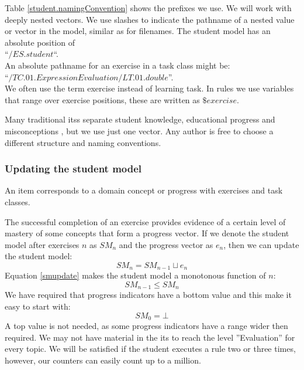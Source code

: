 Table \ref{student.namingConvention} shows the prefixes we use.
We will work with deeply nested vectors.
We use slashes to indicate the pathname of a nested  value or vector in the model, similar as for filenames.
The student model has an absolute position of \\
\indent ``$\mathit{/ES.student}$``.\\
An absolute pathname for an exercise in a task class might be: \\
\indent``$\mathit{/TC.01.ExpressionEvaluation/LT.01.double}$''.\\
We often use the term exercise instead of learning task. 
In rules we use variables that range over exercise positions, these are written as $\$exercise$. 

Many traditional \glspl{its} separate student knowledge, educational progress and misconceptions \citep{brusilovskiy_1993}, but we use just one vector.
Any author is free to choose a different structure and naming conventions.
 



\subsubsection{Updating the student model}


An item corresponds to a domain concept or progress with exercises and task classes.

The successful completion of an exercise provides evidence of a certain level of mastery of some concepts that form a progress vector.
If we denote the student model after exercises $n$ as $SM{_n}$ and the progress vector as $e{_n}$, then we can update the student model:
\begin{equation} \label{smupdate}
SM_{n} = SM_{n-1} \sqcup   e{_n}
\end{equation} 
Equation \ref{smupdate} makes the student model a monotonous function of $n$:
\begin{equation} 
SM_{n-1} \leq SM_{n} 
\end{equation} 
We have required that progress indicators have a bottom value and this make it easy to start with:
\begin{equation} 
SM_{0} = \bot 
\end{equation} 
A top value is not needed, as some progress indicators have a range wider then required.
We may not have material in the \gls{its} to reach the level ''Evaluation'' for every topic. 
We will be satisfied if the student executes a rule two or three times, however, our counters can easily count up to a million.




